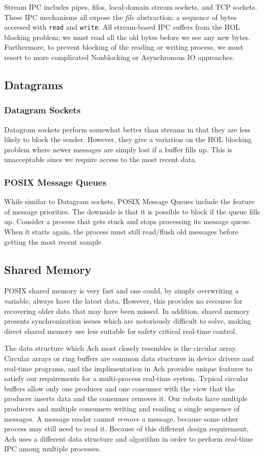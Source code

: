 \documentclass[letterpaper]{IEEEtran}
\begin{document}
Stream IPC includes pipes, fifos, local-domain stream sockets, and TCP
sockets.  These IPC mechanisms all expose the \emph{file} abstraction:
a sequence of bytes accessed with {\tt read} and {\tt write}.  All
stream-based IPC suffers from the HOL blocking problem; we must read
all the old bytes before we see any new bytes.  Furthermore, to
prevent blocking of the reading or writing process, we must resort to
more complicated Nonblocking or Asynchronous IO approaches.

\subsection{Datagrams}

\subsubsection{Datagram Sockets}
Datagram sockets perform somewhat better than streams in that they are
less likely to block the sender.  However, they give a variation on
the HOL blocking problem where newer messages are simply lost if a
buffer fills up.  This is unacceptable since we require access to the
most recent data.

\subsubsection{POSIX Message Queues}
While similar to Datagram sockets, POSIX Message Queues include the
feature of message priorities.  The downside is that it is possible to
block if the queue fills up. Consider a process that gets stuck and
stops processing its message queue.  When it starts again, the process
must still read/flush old messages before getting the most recent
sample.

\subsection{Shared Memory}

POSIX shared memory is very fast and one could, by simply overwriting
a variable, always have the latest data.  However, this provides no
recourse for recovering older data that may have been missed.  In
addition, shared memory presents synchronization issues which are
notoriously difficult to solve, making direct shared memory use less
suitable for safety critical real-time control.

The data structure which Ach most closely resembles is the circular
array.  Circular arrays or ring buffers are common data stuctures in
device drivers and real-time programs, and the implimentation in Ach
provides unique features to satisfy our requirements for a
multi-process real-time system.  Typical circular buffers allow only
one producer and one consumer with the view that the producer inserts
data and the consumer removes it.  Our robots have multiple producers
and multiple consumers writing and reading a single sequence of
messages.  A message reader cannot \emph{remove} a message, because
some other process may still need to read it.  Because of this
different design requirement, Ach uses a different data structure and
algorithm in order to perform real-time IPC among multiple processes.
\end{document}
